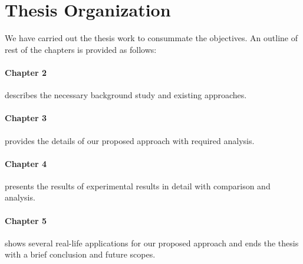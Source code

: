 \section{Thesis Organization}
	We have carried out the thesis work to consummate the objectives. An outline of rest of the chapters is provided as follows:
	\paragraph{Chapter 2} describes the necessary background study and existing approaches.
	\paragraph{Chapter 3} provides the details of our proposed approach with required analysis.
	\paragraph{Chapter 4} presents the results of experimental results in detail with comparison and analysis.
	\paragraph{Chapter 5} shows several real-life applications for our proposed approach and ends the thesis with a brief conclusion and future scopes.
%
